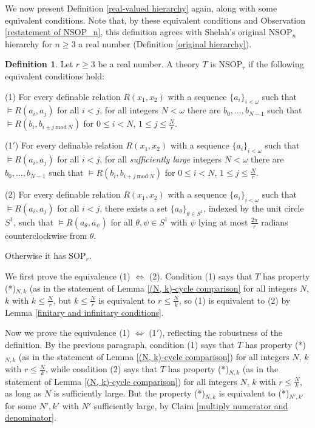 \documentclass{amsart}
\theoremstyle{definition}
\newtheorem{definition}[theorem]{Definition}
\theoremstyle{remark}
\numberwithin{equation}{section}
\begin{document}
We now present Definition \ref{real-valued hierarchy} again, along with some equivalent conditions. Note that, by these equivalent conditions and Observation \ref{restatement of NSOP_n}, this definition agrees with Shelah's original $\mathrm{NSOP}_{n}$ hierarchy for $n \geq 3$ a real number (Definition \ref{original hierarchy}).

\begin{definition}\label{real-valued hierarchy, detailed definition}
    Let $r\geq 3$ be a real number. A theory $T$ is $\mathrm{NSOP}_{r}$ if the following equivalent conditions hold: 

    (1) For every definable relation $R(x_{1}, x_{2})$ with a sequence $\{a_{i}\}_{i < \omega}$ such that $\models R(a_{i}, a_{j})$ for all $i < j$, for all integers $N < \omega$ there are $b_{0}, \ldots, b_{N -1} $ such that $\models R(b_{i}, b_{i+j \mathrm{\: mod \:} N})$ for $0 \leq i <N$, $1 \leq j \leq \frac{N}{r}$.

    (1$'$) For every definable relation $R(x_{1}, x_{2})$ with a sequence $\{a_{i}\}_{i < \omega}$ such that $\models R(a_{i}, a_{j})$ for all $i < j$, for all \textit{sufficiently large} integers $N < \omega$ there are $b_{0}, \ldots, b_{N -1} $ such that $\models R(b_{i}, b_{i+j \mathrm{\: mod \:} N})$ for $0 \leq i <N$, $1 \leq j \leq \frac{N}{r}$.

    (2) For every definable relation $R(x_{1}, x_{2})$ with a sequence $\{a_{i}\}_{i < \omega}$ such that $\models R(a_{i}, a_{j})$ for all $i < j$, there exists a set $\{a_{\theta}\}_{\theta \in S^{1}}$, indexed by the unit circle $S^{1}$, such that $\models R(a_{\theta}, a_{\psi})$ for all $\theta, \psi \in S^{1}$ with $\psi$ lying at most $\frac{2\pi}{r}$ radians counterclockwise from $\theta$.

 Otherwise it has $\mathrm{SOP}_{r}$.
\end{definition}

We first prove the equivalence (1) $\Leftrightarrow$ (2). Condition (1) says that $T$ has property (*)$_{N, k}$ (as in the statement of Lemma \ref{(N, k)-cycle comparison} for all integers $N$, $k$ with $k \leq \frac{N}{r}$, but $k \leq \frac{N}{r}$ is equivalent to $r \leq \frac{N}{k}$, so (1) is equivalent to (2) by Lemma \ref{finitary and infinitary conditions}.

Now we prove the equivalence (1) $\Leftrightarrow$ (1$'$), reflecting the robustness of the definition. By the previous paragraph, condition (1) says that $T$ has property (*)$_{N, k}$ (as in the statement of Lemma \ref{(N, k)-cycle comparison}) for all integers $N$, $k$ with $r \leq \frac{N}{k}$, while condition (2) says that $T$ has property (*)$_{N, k}$ (as in the statement of Lemma \ref{(N, k)-cycle comparison}) for all integers $N$, $k$ with $r \leq \frac{N}{k}$, as long as $N$ is sufficiently large. But the property (*)$_{N, k}$ is equivalent to (*)$_{N', k'}$ for some $N', k'$ with $N'$ sufficiently large, by Claim \ref{multiply numerator and denominator}.
\end{document}
